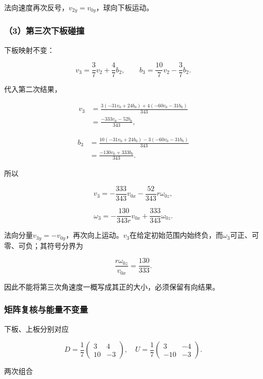 \documentclass[12pt,a4paper,fontset=fandol]{ctexart}
\begin{document}
法向速度再次反号，\(v_{2y}=v_{0y}\)，球向下板运动。

\subsubsection{（3）第三次下板碰撞}\label{ux7b2cux4e09ux6b21ux4e0bux677fux78b0ux649e}

下板映射不变：

\[
v_3=\frac37v_2+\frac47b_2,\qquad
b_3=\frac{10}{7}v_2-\frac37b_2.
\]

代入第二次结果，

\[
\begin{aligned}
v_3
&=\frac{3(-31v_0+24b_0)+4(-60v_0-31b_0)}{343}\\
&=\frac{-333v_0-52b_0}{343},
\end{aligned}
\]

\[
\begin{aligned}
b_3
&=\frac{10(-31v_0+24b_0)-3(-60v_0-31b_0)}{343}\\
&=\frac{-130v_0+333b_0}{343}.
\end{aligned}
\]

所以

\[
\boxed{v_3=-\frac{333}{343}v_{0x}
-\frac{52}{343}r\omega_{0z}},
\]

\[
\boxed{\omega_3=-\frac{130}{343r}v_{0x}
+\frac{333}{343}\omega_{0z}}.
\]

法向分量\(v_{3y}=-v_{0y}\)，再次向上运动。\(v_3\)在给定初始范围内始终负，而\(\omega_3\)可正、可零、可负；其符号分界为

\[
\frac{r\omega_{0z}}{v_{0x}}=\frac{130}{333}.
\]

因此不能将第三次角速度一概写成其正的大小，必须保留有向结果。

\subsubsection{矩阵复核与能量不变量}\label{ux77e9ux9635ux590dux6838ux4e0eux80fdux91cfux4e0dux53d8ux91cf}

下板、上板分别对应

\[
D=\frac17\begin{pmatrix}3&4\\10&-3\end{pmatrix},
\quad
U=\frac17\begin{pmatrix}3&-4\\-10&-3\end{pmatrix}.
\]

两次组合
\end{document}
